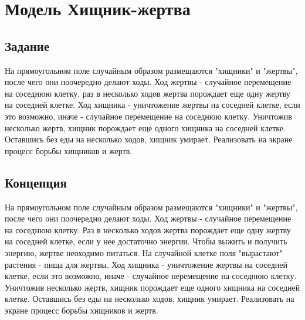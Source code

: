 \documentclass[a4paper]{article}
\begin{document}
\vfill %
\tableofcontents
\newpage

\section{Модель Хищник-жертва}
\subsection{Задание}
На прямоугольном поле случайным образом размещаются "хищники" и "жертвы", после чего они поочередно делают ходы. Ход жертвы - случайное перемещение на соседнюю клетку, раз в несколько ходов жертва порождает еще одну жертву на соседней клетке. Ход хищника - уничтожение жертвы на соседней клетке, если это возможно, иначе - случайное перемещение на соседнюю клетку. Уничтожив несколько жертв, хищник порождает еще одного хищника на соседней клетке. Оставшись без еды на несколько ходов, хищник умирает. Реализовать на экране процесс борьбы хищников и жертв. 

\subsection{Концепция}
На прямоугольном поле случайным образом размещаются "хищники" и "жертвы", после чего они поочередно делают ходы. Ход жертвы - случайное перемещение на соседнюю клетку. Раз в несколько ходов жертва порождает еще одну жертву на соседней клетке, если у нее достаточно энергии. Чтобы выжить и получить энергию, жертве неоходимо питаться. На случайной клетке поля "вырастают" растения - пища для жертвы. Ход хищника - уничтожение жертвы на соседней клетке, если это возможно, иначе - случайное перемещение на соседнюю клетку. Уничтожив несколько жертв, хищник порождает еще одного хищника на соседней клетке. Оставшись без еды на несколько ходов, хищник умирает. Реализовать на экране процесс борьбы хищников и жертв. 
\end{document}
